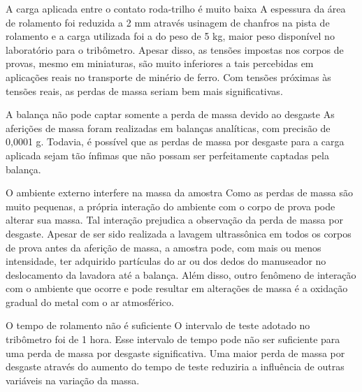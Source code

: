 \documentclass{beamer}
\begin{document}
\begin{frame}
\begin{block}{A carga aplicada entre o contato roda-trilho é muito baixa}
	A espessura da área de rolamento foi reduzida a 2 mm através usinagem de chanfros na pista de rolamento e a carga utilizada foi a do peso de 5 kg, maior peso disponível no laboratório para o tribômetro. Apesar disso, as tensões impostas nos corpos de provas, mesmo em miniaturas, são muito inferiores a tais percebidas em aplicações reais no transporte de minério de ferro. Com tensões próximas às tensões reais, as perdas de massa seriam bem mais significativas.
\end{block}

\end{frame}

\begin{frame}
\begin{block}{A balança não pode captar somente a perda de massa devido ao desgaste}
	As aferições de massa foram realizadas em balanças analíticas, com precisão de 0,0001 g. Todavia, é possível que as perdas de massa por desgaste para a carga aplicada sejam tão ínfimas que não possam ser perfeitamente captadas pela balança.
\end{block}

\end{frame}

\begin{frame}
\begin{block}{O ambiente externo interfere na massa da amostra}
	Como as perdas de massa são muito pequenas, a própria interação do ambiente com o corpo de prova pode alterar sua massa. Tal interação prejudica a observação da perda de massa por desgaste. Apesar de ser sido realizada a lavagem ultrassônica em todos os corpos de prova antes da aferição de massa, a amostra pode, com mais ou menos intensidade, ter adquirido partículas do ar ou dos dedos do manuseador no deslocamento da lavadora até a balança. Além disso, outro fenômeno de interação com o ambiente que ocorre e pode resultar em alterações de massa é a oxidação gradual do metal com o ar atmosférico.
\end{block}

\end{frame}

\begin{frame}
\begin{block}{O tempo de rolamento não é suficiente}
	O intervalo de teste adotado no tribômetro foi de 1 hora. Esse intervalo de tempo pode não ser suficiente para uma perda de massa por desgaste significativa. Uma maior perda de massa por desgaste através do aumento do tempo de teste reduziria a influência de outras variáveis na variação da massa.
\end{block}

\end{frame}
\end{document}
